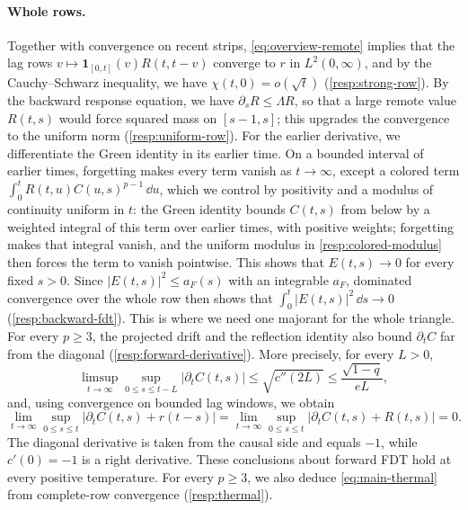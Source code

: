 \paragraph{Whole rows.}
Together with convergence on recent strips, \eqref{eq:overview-remote} implies that the lag rows $v\mapsto\mathbf1_{[0,t]}(v)R(t,t-v)$ converge to $r$ in $L^2(0,\infty)$, and by the Cauchy--Schwarz inequality, we have $\chi(t,0)=o(\sqrt t)$ (\cref{resp:strong-row}). By the backward response equation, we have $\partial_sR\le\Lambda R$, so that a large remote value $R(t,s)$ would force squared mass on $[s-1,s]$; this upgrades the convergence to the uniform norm (\cref{resp:uniform-row}). For the earlier derivative, we differentiate the Green identity in its earlier time. On a bounded interval of earlier times, forgetting makes every term vanish as $t\to\infty$, except a colored term $\int_0^tR(t,u)C(u,s)^{p-1}\,\dd u$, which we control by positivity and a modulus of continuity uniform in $t$: the Green identity bounds $C(t,s)$ from below by a weighted integral of this term over earlier times, with positive weights; forgetting makes that integral vanish, and the uniform modulus in \eqref{resp:colored-modulus} then forces the term to vanish pointwise. This shows that $E(t,s)\to0$ for every fixed $s>0$. Since $|E(t,s)|^2\le a_F(s)$ with an integrable $a_F$, dominated convergence over the whole row then shows that $\int_0^t|E(t,s)|^2\,\dd s\to0$ (\cref{resp:backward-fdt}). This is where we need one majorant for the whole triangle. For every $p\ge3$, the projected drift and the reflection identity also bound $\partial_tC$ far from the diagonal (\cref{resp:forward-derivative}). More precisely, for every $L>0$,
\[
 \limsup_{t\to\infty}\sup_{0\le s\le t-L}|\partial_tC(t,s)|
 \le\sqrt{c''(2L)}\le\frac{\sqrt{1-q}}{eL},
\]
and, using convergence on bounded lag windows, we obtain
\[
 \lim_{t\to\infty}\sup_{0\le s\le t}|\partial_tC(t,s)+r(t-s)|
 =\lim_{t\to\infty}\sup_{0\le s\le t}|\partial_tC(t,s)+R(t,s)|=0.
\]
The diagonal derivative is taken from the causal side and equals $-1$, while $c'(0)=-1$ is a right derivative. These conclusions about forward FDT hold at every positive temperature. For every $p\ge3$, we also deduce \eqref{eq:main-thermal} from complete-row convergence (\cref{resp:thermal}).

